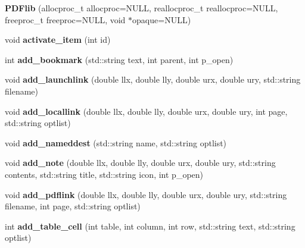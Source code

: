 \begin{DoxyCompactItemize}
\item 
\hypertarget{classPDFlib_a63a60e9b1c4c18e6db742f85011510f3}{}\label{classPDFlib_a63a60e9b1c4c18e6db742f85011510f3} 
{\bfseries P\+D\+Flib} (allocproc\+\_\+t allocproc=N\+U\+LL, reallocproc\+\_\+t reallocproc=N\+U\+LL, freeproc\+\_\+t freeproc=N\+U\+LL, void $\ast$opaque=N\+U\+LL)
\item 
\hypertarget{classPDFlib_a83cf7a11d217af0e33e6dca6267965c4}{}\label{classPDFlib_a83cf7a11d217af0e33e6dca6267965c4} 
void {\bfseries activate\+\_\+item} (int id)
\item 
\hypertarget{classPDFlib_afbf7e219b67e0099610963c1ca9b6dca}{}\label{classPDFlib_afbf7e219b67e0099610963c1ca9b6dca} 
int {\bfseries add\+\_\+bookmark} (std\+::string text, int parent, int p\+\_\+open)
\item 
\hypertarget{classPDFlib_a32faa0f4597b6dceacd54a4a5497823d}{}\label{classPDFlib_a32faa0f4597b6dceacd54a4a5497823d} 
void {\bfseries add\+\_\+launchlink} (double llx, double lly, double urx, double ury, std\+::string filename)
\item 
\hypertarget{classPDFlib_a2d47dcbd27a69e9c1c02ca608f927ab7}{}\label{classPDFlib_a2d47dcbd27a69e9c1c02ca608f927ab7} 
void {\bfseries add\+\_\+locallink} (double llx, double lly, double urx, double ury, int page, std\+::string optlist)
\item 
\hypertarget{classPDFlib_a16845662dabe0494d69b016846f2adcc}{}\label{classPDFlib_a16845662dabe0494d69b016846f2adcc} 
void {\bfseries add\+\_\+nameddest} (std\+::string name, std\+::string optlist)
\item 
\hypertarget{classPDFlib_ab054c136755f297058ac9812adefafec}{}\label{classPDFlib_ab054c136755f297058ac9812adefafec} 
void {\bfseries add\+\_\+note} (double llx, double lly, double urx, double ury, std\+::string contents, std\+::string title, std\+::string icon, int p\+\_\+open)
\item 
\hypertarget{classPDFlib_acc2002bc0e060620bfe97eae7dcc9371}{}\label{classPDFlib_acc2002bc0e060620bfe97eae7dcc9371} 
void {\bfseries add\+\_\+pdflink} (double llx, double lly, double urx, double ury, std\+::string filename, int page, std\+::string optlist)
\item 
\hypertarget{classPDFlib_a153ce04a9c160a24d13763f8ba6578fa}{}\label{classPDFlib_a153ce04a9c160a24d13763f8ba6578fa} 
int {\bfseries add\+\_\+table\+\_\+cell} (int table, int column, int row, std\+::string text, std\+::string optlist)
\item 

\end{DoxyCompactItemize}
